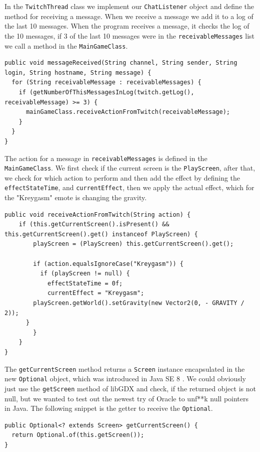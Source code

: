 \documentclass[12p]{article}
\begin{document}
In the \texttt{TwitchThread} class we implement our \texttt{ChatListener} object and define the method for receiving a message. When we receive a message we add it to a log of the last 10 messages. When the program receives a message, it checks the log of the 10 messages, if 3 of the last 10 messages were in the \texttt{receivableMessages} list we call a method in the \texttt{MainGameClass}.

\begin{verbatim}
public void messageReceived(String channel, String sender, String login, String hostname, String message) {
  for (String receivableMessage : receivableMessages) {
    if (getNumberOfThisMessagesInLog(twitch.getLog(), receivableMessage) >= 3) {
      mainGameClass.receiveActionFromTwitch(receivableMessage);
    }
  }
}
\end{verbatim}

The action for a message in \texttt{receivableMessages} is defined in the \texttt{MainGameClass}. We first check if the current screen is the \texttt{PlayScreen}, after that, we check for which action to perform and then add the effect by defining the \texttt{effectStateTime}, and \texttt{currentEffect}, then we apply the actual effect, which for the "Kreygasm" emote is changing the gravity.

\begin{verbatim}
public void receiveActionFromTwitch(String action) {
	if (this.getCurrentScreen().isPresent() && this.getCurrentScreen().get() instanceof PlayScreen) {
		playScreen = (PlayScreen) this.getCurrentScreen().get();

		if (action.equalsIgnoreCase("Kreygasm")) {
		  if (playScreen != null) {
		    effectStateTime = 0f;
		    currentEffect = "Kreygasm";
        playScreen.getWorld().setGravity(new Vector2(0, - GRAVITY / 2));
      }
		}
	}
}
\end{verbatim}

The \texttt{getCurrentScreen} method returns a \texttt{Screen} instance encapsulated in the new \texttt{Optional} object, which was introduced in Java SE 8 \cite{JavaOptional}. We could obviously just use the \texttt{getScreen} method of libGDX and check, if the returned object is not null, but we wanted to test out the newest try of Oracle to unf**k null pointers in Java. The following snippet is the getter to receive the \texttt{Optional}.

\begin{verbatim}
public Optional<? extends Screen> getCurrentScreen() {
  return Optional.of(this.getScreen());
}
\end{verbatim}
\end{document}
